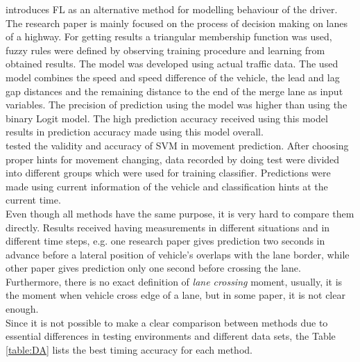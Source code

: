 \cite{Fuzz} introduces \gls{FL} as an alternative method for modelling behaviour of the driver. The research paper is mainly focused on the process of decision making on lanes of a highway. For getting results a triangular membership function was used, fuzzy rules were defined by observing training procedure and learning from obtained results. The model was developed using actual traffic data. The used model combines the speed and speed difference of the vehicle, the lead and lag gap distances and the remaining distance to the end of the merge lane as input variables. The precision of prediction using the model was
higher than using the binary Logit model. The high prediction accuracy received using this model results in prediction accuracy made using this model overall. \\

\cite{VectMash} tested the validity and  accuracy of \gls{SVM} in movement prediction. After choosing proper hints for movement changing, data recorded by doing test were divided into different groups which were used for training classifier. Predictions were made using current information of the vehicle and classification hints at the current time. \\

Even though all methods have the same purpose, it is very hard to compare them directly. Results received having measurements in different situations and in different time steps, e.g. one research paper gives prediction two seconds in advance before a lateral position of vehicle’s overlaps with the lane border, while other paper gives prediction only one second before crossing the lane. Furthermore, there is no exact definition of \textit{lane crossing} moment, usually, it is the moment when vehicle cross edge of a lane, but in some paper, it is not clear enough. \\

Since it is not possible to make a clear comparison between methods due to essential differences in testing environments and different data sets, the Table \ref{table:DA} lists the best timing accuracy for each method. \\


